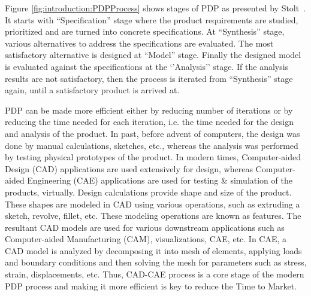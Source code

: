 	\bigskip
	
Figure \ref{fig:introduction:PDPProcess} shows stages of PDP as presented by Stolt~\cite{Stolt2008}. It starts with ``Specification'' stage where the product requirements are studied, prioritized and are turned into concrete specifications. At ``Synthesis'' stage, various alternatives to address the specifications are evaluated. The most satisfactory alternative is designed at ``Model'' stage. Finally the designed model is evaluated against the specifications at the `'Analysis'' stage. If the analysis results are not satisfactory, then the process is iterated from ``Synthesis'' stage again, until a satisfactory product is arrived at.

PDP can be made more efficient either by reducing number of iterations or by reducing the time needed for each iteration, i.e. the time needed for the design and analysis of the product.
In past, before advent of computers, the design was done by manual calculations, sketches, etc., whereas the analysis was performed by testing physical prototypes of the product. In modern times, Computer-aided Design (CAD) applications are used extensively for design, whereas Computer-aided Engineering (CAE) applications are used for testing \& simulation of the products, virtually. Design calculations provide shape and size of the product. These shapes are modeled in CAD using various operations, such as extruding a sketch, revolve, fillet, etc. These modeling operations are known as features. The resultant CAD models are used for various downstream applications such as Computer-aided Manufacturing (CAM), visualizations, CAE, etc. In CAE, a CAD model is analyzed by decomposing it into mesh of elements, applying loads and boundary conditions and then solving the mesh for parameters such as stress, strain, displacements, etc. Thus, CAD-CAE process is a core stage of the modern PDP process and making it more efficient is key to reduce the Time to Market.

%
%

